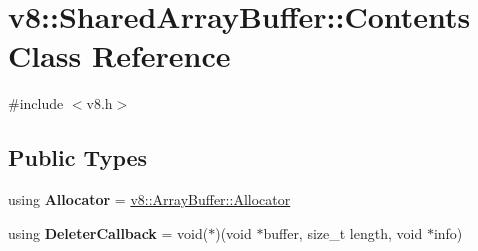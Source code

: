 \hypertarget{classv8_1_1SharedArrayBuffer_1_1Contents}{}\section{v8\+:\+:Shared\+Array\+Buffer\+:\+:Contents Class Reference}
\label{classv8_1_1SharedArrayBuffer_1_1Contents}


{\ttfamily \#include $<$v8.\+h$>$}

\subsection*{Public Types}
\begin{DoxyCompactItemize}
\item 
\mbox{\label{classv8_1_1SharedArrayBuffer_1_1Contents_a9b3beca611144f6514647ce8e6937be7}} 
using {\bfseries Allocator} = \mbox{\hyperlink{classv8_1_1ArrayBuffer_1_1Allocator}{v8\+::\+Array\+Buffer\+::\+Allocator}}
\item 
\mbox{\label{classv8_1_1SharedArrayBuffer_1_1Contents_a68a6bf80c68a3b8c6ac2eb6fb38169f0}} 
using {\bfseries Deleter\+Callback} = void($\ast$)(void $\ast$buffer, size\+\_\+t length, void $\ast$info)
\end{DoxyCompactItemize}
